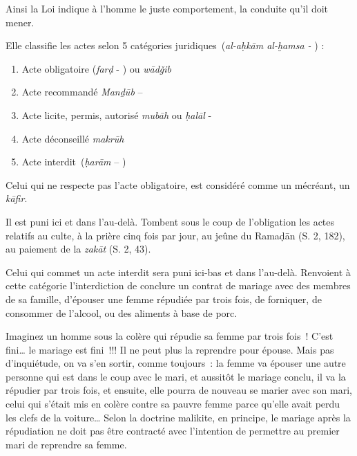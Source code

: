 Ainsi la Loi indique à l'homme le juste comportement, la conduite qu'il
doit mener. 
\begin{Def}

Elle classifie les actes selon 5 catégories
juridiques~(\emph{al-aḥkām al-ḫamsa -} ) :

\begin{enumerate}
\def\labelenumi{\arabic{enumi}.}
\item
  Acte obligatoire (\emph{farḍ} - ) ou \emph{wādǧib} 
\item
  Acte recommandé \emph{Manḏūb} -- 
\item
  Acte licite, permis, autorisé \emph{mubāh} ou \emph{ḥalāl} - 
\item
  Acte déconseillé \emph{makrūh} 
\item
  Acte interdit~(\emph{ḥarām} -- )
\end{enumerate}
\end{Def}

\begin{Def}[kāfir]
Celui qui ne respecte pas l'acte obligatoire, est considéré comme un
mécréant, un \emph{kāfir}.
\end{Def}

 Il est puni ici et dans l'au-delà. Tombent
sous le coup de l'obligation les actes relatifs au culte, à la prière
cinq fois par jour, au jeûne du Ramaḍān (S. 2, 182), au paiement de la
\emph{zakāt} (S. 2, 43).

Celui qui commet un acte interdit sera puni ici-bas et dans l'au-delà.
Renvoient à cette catégorie l'interdiction de conclure un contrat de
mariage avec des membres de sa famille, d'épouser une femme répudiée par
trois fois, de forniquer, de consommer de l'alcool, ou des aliments à
base de porc.
\begin{Ex}
Imaginez un homme sous la colère qui répudie sa femme par
trois fois~! C'est fini\ldots{} le mariage est fini~!!! Il ne peut plus
la reprendre pour épouse. Mais pas d'inquiétude, on va s'en sortir,
comme toujours~: la femme va épouser une autre personne qui est dans le
coup avec le mari, et aussitôt le mariage conclu, il va la répudier par
trois fois, et ensuite, elle pourra de nouveau se marier avec son mari,
celui qui s'était mis en colère contre sa pauvre femme parce qu'elle
avait perdu les clefs de la voiture\ldots{} Selon la doctrine malikite,
en principe, le mariage après la répudiation ne doit pas être contracté
avec l'intention de permettre au premier mari de reprendre sa femme.

\end{Ex}

